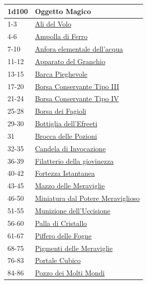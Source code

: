 \begin{multicols}{2}
{{\small\begin{tabularx}{\linewidth}{ll}
		\toprule
\rowcolor{gray!20}\textbf{1d100} & \textbf{Oggetto Magico}\\
\toprule
1-3 & \hyperlink{Ali del Volo}{Ali del Volo}\\
\rowcolor{gray!20}4-6 & \hyperlink{Ampolla di Ferro}{Ampolla di Ferro}\\
7-10 & \hyperlink{Anfora elementale dell'acqua}{Anfora elementale dell'acqua}\\
\rowcolor{gray!20}11-12 & \hyperlink{Apparato del Granchio}{Apparato del Granchio}\\
13-15 & \hyperlink{Barca Pieghevole}{Barca Pieghevole}\\
\rowcolor{gray!20}17-20 & \hyperlink{Borsa Conservante Tipo III}{Borsa Conservante Tipo III}\\
21-24 & \hyperlink{Borsa Conservante Tipo IV}{Borsa Conservante Tipo IV}\\
\rowcolor{gray!20}25-28 & \hyperlink{Borsa dei Fagioli}{Borsa dei Fagioli}\\
29-30 & \hyperlink{Bottiglia dell'Efreeti}{Bottiglia dell'Efreeti}\\
\rowcolor{gray!20}31 & \hyperlink{Brocca delle Pozioni}{Brocca delle Pozioni}\\
32-35 & \hyperlink{Candela di Invocazione}{Candela di Invocazione}\\
\rowcolor{gray!20}36-39 & \hyperlink{Filatterio della giovinezza}{Filatterio della giovinezza}\\
40-42 & \hyperlink{Fortezza Istantanea}{Fortezza Istantanea}\\
\rowcolor{gray!20}43-45 & \hyperlink{Mazzo delle Meraviglie}{Mazzo delle Meraviglie}\\
46-50 & \hyperlink{Miniatura dal Potere Meraviglioso}{Miniatura dal Potere Meraviglioso}\\
\rowcolor{gray!20}51-55 & \hyperlink{Munizione dell'Uccisione}{Munizione dell'Uccisione}\\
56-60 & \hyperlink{Palla di Cristallo}{Palla di Cristallo}\\
\rowcolor{gray!20}61-67 & \hyperlink{Piffero delle Fogne}{Piffero delle Fogne}\\
68-75 & \hyperlink{Pigmenti delle Meraviglie}{Pigmenti delle Meraviglie}\\
\rowcolor{gray!20}76-83 & \hyperlink{Portale Cubico}{Portale Cubico}\\
84-86 & \hyperlink{Pozzo dei Molti Mondi}{Pozzo dei Molti Mondi}\\

\end{tabularx}}}
\end{multicols}
